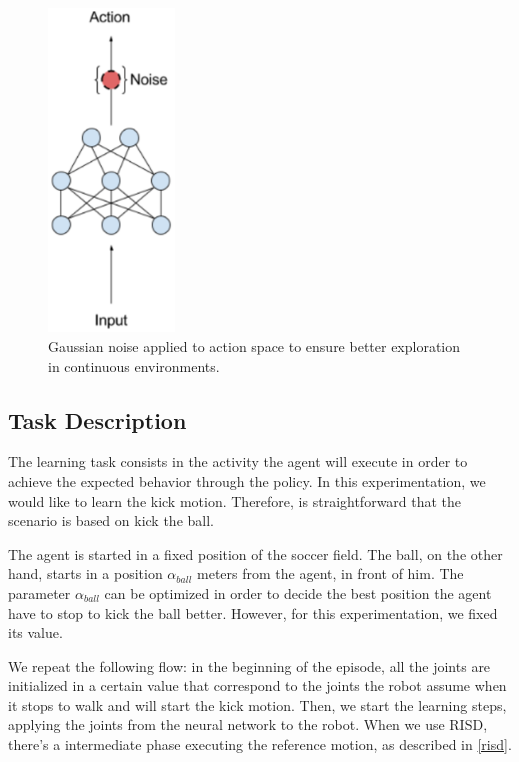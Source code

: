 \begin{figure}[!htbp]
	\centering
	\includegraphics[width=0.3\textwidth]{Cap5/gaussiannoise.eps}
	\caption{Gaussian noise applied to action space to ensure better exploration in continuous environments.
	\cite{parameternoiseblog}
	}
	\label{gaussiannoise}
\end{figure}

\subsection{Task Description}
The learning task consists in the activity the agent will execute in order to achieve the expected behavior through the policy. In this experimentation, we would like to learn the kick motion. Therefore, is straightforward that the scenario is based on kick the ball.

The agent is started in a fixed position of the soccer field. The ball, on the other hand, starts in a position $\alpha_{ball}$ meters from the agent, in front of him. The parameter $\alpha_{ball}$ can be optimized in order to decide the best position the agent have to stop to kick the ball better. However, for this experimentation, we fixed its value.

We repeat the following flow: in the beginning of the episode, all the joints are initialized in a certain value that correspond to the joints the robot assume when it stops to walk and will start the kick motion. Then, we start the learning steps, applying the joints from the neural network to the robot. When we use RISD, there's a intermediate phase executing the reference motion, as described in \ref{risd}.


